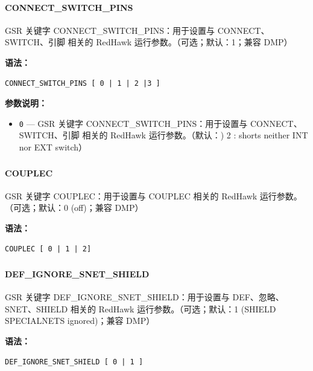 \paragraph*{CONNECT_SWITCH_PINS}

GSR 关键字 CONNECT_SWITCH_PINS：用于设置与 CONNECT、SWITCH、引脚 相关的 RedHawk 运行参数。（可选；默认：1；兼容 DMP）

\textbf{语法：}
\begin{lstlisting}
CONNECT_SWITCH_PINS [ 0 | 1 | 2 |3 ]
\end{lstlisting}

\textbf{参数说明：}
\begin{itemize}
\item \texttt{0} — GSR 关键字 CONNECT\_SWITCH\_PINS：用于设置与 CONNECT、SWITCH、引脚 相关的 RedHawk 运行参数。（默认：) 2 : shorts neither INT nor EXT switch）
\end{itemize}

\subsubsection{}
\paragraph*{COUPLEC}

GSR 关键字 COUPLEC：用于设置与 COUPLEC 相关的 RedHawk 运行参数。（可选；默认：0 (off)；兼容 DMP）

\textbf{语法：}
\begin{lstlisting}
COUPLEC [ 0 | 1 | 2]
\end{lstlisting}

\subsubsection{}
\paragraph*{DEF_IGNORE_SNET_SHIELD}

GSR 关键字 DEF_IGNORE_SNET_SHIELD：用于设置与 DEF、忽略、SNET、SHIELD 相关的 RedHawk 运行参数。（可选；默认：1 (SHIELD SPECIALNETS ignored)；兼容 DMP）

\textbf{语法：}
\begin{lstlisting}
DEF_IGNORE_SNET_SHIELD [ 0 | 1 ]
\end{lstlisting}

\subsubsection{}
